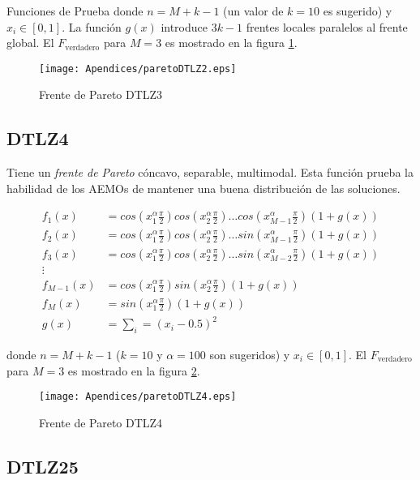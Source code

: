 \begin{chapter}{Funciones de Prueba}
donde $n=M+k-1$ (un valor de $k=10$ es sugerido) y $x_i\in[0,1]$. La  funci\'on $g(x)$ introduce  $3k-1$ frentes locales paralelos al frente global.
El $F_\text{verdadero}$ para $M=3$ es mostrado en la figura \ref{fig:DTLZ3}. 

\begin{figure}[h!]
 \centering
\texttt{[image: Apendices/paretoDTLZ2.eps]}
\caption{Frente de Pareto DTLZ3}
\label{fig:DTLZ3}
\end{figure}




\subsection*{DTLZ4}


Tiene un {\it frente de Pareto}  c\'oncavo, separable, multimodal. Esta funci\'on prueba la habilidad
de los AEMOs de mantener una buena distribuci\'on de las soluciones.


\begin{align*}
f_1(x)&=cos(x_1^\alpha\frac{\pi}{2})cos(x_2^\alpha\frac{\pi}{2})\hdots cos(x_{M-1}^\alpha\frac{\pi}{2})(1+g(x))\\
f_2(x)&=cos(x_1^\alpha\frac{\pi}{2})cos(x_2^\alpha\frac{\pi}{2})\hdots sin(x_{M-1}^\alpha\frac{\pi}{2})(1+g(x))\\
f_3(x)&=cos(x_1^\alpha\frac{\pi}{2})cos(x_2^\alpha\frac{\pi}{2})\hdots sin(x_{M-2}^\alpha\frac{\pi}{2})(1+g(x))\\
\vdots&\\
f_{M-1}(x)&=cos(x_1^\alpha\frac{\pi}{2})sin(x_2^\alpha\frac{\pi}{2})(1+g(x))\\
f_{M}(x)&=sin(x_1^\alpha\frac{\pi}{2})(1+g(x))\\
g(x)&=\sum_i=(x_i-0.5)^2
\end{align*}


donde $n=M+k-1$ ($k=10$ y $\alpha=100$ son sugeridos) y $x_i\in[0,1]$. El $F_\text{verdadero}$ para $M=3$ es mostrado en la figura \ref{fig:DTLZ4}. 

\begin{figure}[h!]
 \centering
\texttt{[image: Apendices/paretoDTLZ4.eps]}
\caption{Frente de Pareto DTLZ4}
\label{fig:DTLZ4}
\end{figure}




\subsection*{DTLZ25}



\end{chapter}
